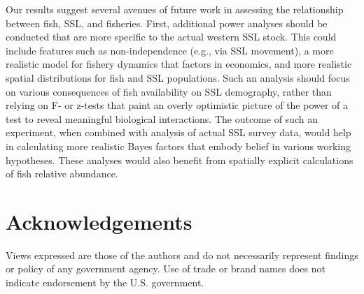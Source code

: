 \documentclass[11pt]{article}
\begin{document}
Our results suggest several avenues of future work in assessing the relationship between fish, SSL, and fisheries.  First, additional power analyses should be conducted that are more specific to the actual western SSL stock.  This could include features such as non-independence (e.g., via SSL movement), a more realistic model for fishery dynamics that factors in economics, and more realistic spatial distributions for fish and SSL populations.  Such an analysis should focus on various consequences of fish availability on SSL demography, rather than relying on F- or z-tests \citep[e.g.,][]{Calkins:2008ve,Hui:2011uq,Soboleff:2006fk} that paint an overly optimistic picture of the power of a test to reveal meaningful biological interactions.  The outcome of such an experiment, when combined with analysis of actual SSL survey data, would help in calculating more realistic Bayes factors that embody belief in various working hypotheses. These analyses would also benefit from spatially explicit calculations of fish relative abundance.




\section{Acknowledgements}
Views expressed are those of the authors and do not necessarily represent findings or policy of any government agency.  Use of trade or brand names does not indicate endorsement by the U.S. government.


\end{document}
